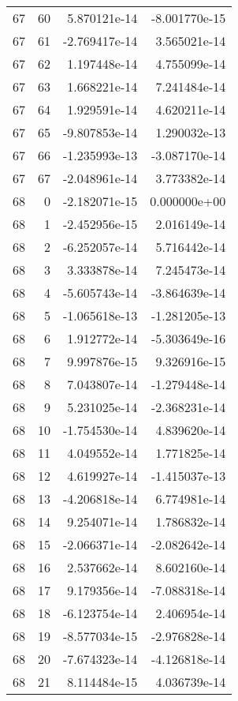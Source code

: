 \begin{tabular}{rrrr}
  67 &   60 &  5.870121e-14 & -8.001770e-15 \\
  67 &   61 & -2.769417e-14 &  3.565021e-14 \\
  67 &   62 &  1.197448e-14 &  4.755099e-14 \\
  67 &   63 &  1.668221e-14 &  7.241484e-14 \\
  67 &   64 &  1.929591e-14 &  4.620211e-14 \\
  67 &   65 & -9.807853e-14 &  1.290032e-13 \\
  67 &   66 & -1.235993e-13 & -3.087170e-14 \\
  67 &   67 & -2.048961e-14 &  3.773382e-14 \\
  68 &    0 & -2.182071e-15 &  0.000000e+00 \\
  68 &    1 & -2.452956e-15 &  2.016149e-14 \\
  68 &    2 & -6.252057e-14 &  5.716442e-14 \\
  68 &    3 &  3.333878e-14 &  7.245473e-14 \\
  68 &    4 & -5.605743e-14 & -3.864639e-14 \\
  68 &    5 & -1.065618e-13 & -1.281205e-13 \\
  68 &    6 &  1.912772e-14 & -5.303649e-16 \\
  68 &    7 &  9.997876e-15 &  9.326916e-15 \\
  68 &    8 &  7.043807e-14 & -1.279448e-14 \\
  68 &    9 &  5.231025e-14 & -2.368231e-14 \\
  68 &   10 & -1.754530e-14 &  4.839620e-14 \\
  68 &   11 &  4.049552e-14 &  1.771825e-14 \\
  68 &   12 &  4.619927e-14 & -1.415037e-13 \\
  68 &   13 & -4.206818e-14 &  6.774981e-14 \\
  68 &   14 &  9.254071e-14 &  1.786832e-14 \\
  68 &   15 & -2.066371e-14 & -2.082642e-14 \\
  68 &   16 &  2.537662e-14 &  8.602160e-14 \\
  68 &   17 &  9.179356e-14 & -7.088318e-14 \\
  68 &   18 & -6.123754e-14 &  2.406954e-14 \\
  68 &   19 & -8.577034e-15 & -2.976828e-14 \\
  68 &   20 & -7.674323e-14 & -4.126818e-14 \\
  68 &   21 &  8.114484e-15 &  4.036739e-14 \\

\end{tabular}
